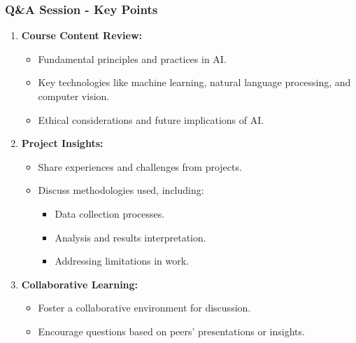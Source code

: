 \documentclass[aspectratio=169]{beamer}
\begin{document}
\begin{frame}[fragile]
    \frametitle{Q\&A Session - Key Points}
    \begin{enumerate}
        \item \textbf{Course Content Review:}
        \begin{itemize}
            \item Fundamental principles and practices in AI.
            \item Key technologies like machine learning, natural language processing, and computer vision.
            \item Ethical considerations and future implications of AI.
        \end{itemize}
        
        \item \textbf{Project Insights:}
        \begin{itemize}
            \item Share experiences and challenges from projects.
            \item Discuss methodologies used, including:
            \begin{itemize}
                \item Data collection processes.
                \item Analysis and results interpretation.
                \item Addressing limitations in work.
            \end{itemize}
        \end{itemize}

        \item \textbf{Collaborative Learning:}
        \begin{itemize}
            \item Foster a collaborative environment for discussion.
            \item Encourage questions based on peers’ presentations or insights.
        \end{itemize}
    \end{enumerate}
\end{frame}
\end{document}
